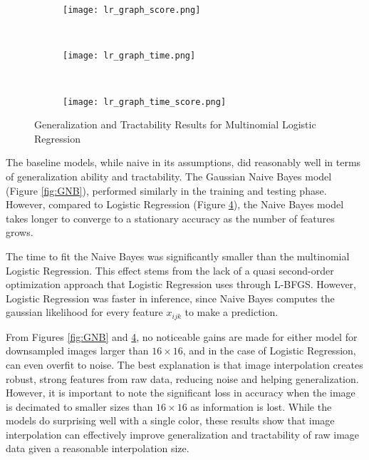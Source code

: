 \documentclass{article}
\begin{document}
\begin{figure}
  \centering
  \begin{subfigure}[b]{0.3\textwidth}
    \centering
    \texttt{[image: lr\_graph\_score.png]}
    \caption*{}
    \label{fig:lr_graph_score}
  \end{subfigure}
  ~
  \begin{subfigure}[b]{0.3\textwidth}
    \centering
    \texttt{[image: lr\_graph\_time.png]}
    \caption*{}
    \label{fig:lr_graph_time}
  \end{subfigure}
  ~
  \begin{subfigure}[b]{0.3\textwidth}
    \centering
    \texttt{[image: lr\_graph\_time\_score.png]}
    \caption*{}
    \label{fig:lr_graph_time_score}
  \end{subfigure}
  \vspace{-20pt}
  \caption{Generalization and Tractability Results for Multinomial Logistic Regression}
  \label{fig:MLR}
\end{figure}
The baseline models, while naive in its assumptions, did reasonably well in
terms of generalization ability and tractability.
The Gaussian Naive Bayes model (Figure \ref{fig:GNB}),
performed similarly in the training and testing phase.
However, compared to Logistic Regression
(Figure \ref{fig:MLR}), the Naive Bayes model takes longer to converge to a
stationary accuracy as the number of features grows.

The time to fit the Naive Bayes was significantly smaller than the multinomial
Logistic Regression. This effect stems from the lack of a quasi second-order
optimization approach that Logistic Regression uses through L-BFGS. However,
Logistic Regression was faster in inference, since Naive Bayes computes
the gaussian likelihood for every feature $x_{ijk}$ to make a prediction.

From Figures \ref{fig:GNB} and \ref{fig:MLR}, no noticeable gains
are made for either model for downsampled images larger than $16 \times 16$,
and in the case of Logistic Regression, can even overfit to noise.
The best explanation is that image interpolation creates robust, strong features
from raw data, reducing noise and helping generalization. However,
it is important to note the significant loss in accuracy when the image is
decimated to smaller sizes than $16 \times 16$ as information is lost. While
the models do surprising well with a single color, these results show that
image interpolation can effectively improve generalization and tractability of
raw image data given a reasonable interpolation size.
\end{document}
